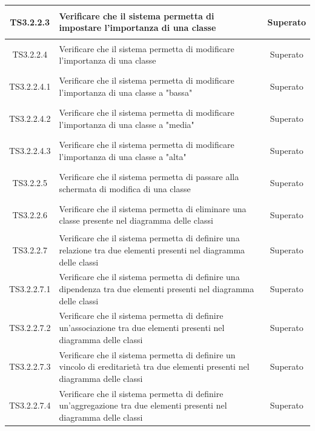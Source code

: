 \documentclass[../PianoDiQualifica.tex]{subfiles}
\begin{document}
\begin{longtable}{|c|>{\centering}p{10cm}|c|}
	\hline
	\hypertarget{TS3.2.2.3}{TS3.2.2.3} & Verificare che il sistema permetta di impostare l'importanza di una classe & Superato \\
	\hline
	\hypertarget{TS3.2.2.4}{TS3.2.2.4} & Verificare che il sistema permetta di modificare l'importanza di una classe & Superato \\
	\hline
	\hypertarget{TS3.2.2.4.1}{TS3.2.2.4.1} & Verificare che il sistema permetta di modificare l'importanza di una classe a "bassa" & Superato \\
	\hline
	\hypertarget{TS3.2.2.4.2}{TS3.2.2.4.2} & Verificare che il sistema permetta di modificare l'importanza di una classe a "media" & Superato \\
	\hline
	\hypertarget{TS3.2.2.4.3}{TS3.2.2.4.3} & Verificare che il sistema permetta di modificare l'importanza di una classe a "alta" & Superato \\
	\hline
	\hypertarget{TS3.2.2.5}{TS3.2.2.5} & Verificare che il sistema permetta di passare alla schermata di modifica di una classe & Superato \\
	\hline
	\hypertarget{TS3.2.2.6}{TS3.2.2.6} & Verificare che il sistema permetta di eliminare una classe presente nel diagramma delle classi & Superato \\
	\hline
	\hypertarget{TS3.2.2.7}{TS3.2.2.7} & Verificare che il sistema permetta di definire una relazione tra due elementi presenti nel diagramma delle classi & Superato \\
	\hline
	\hypertarget{TS3.2.2.7.1}{TS3.2.2.7.1} & Verificare che il sistema permetta di definire una dipendenza tra due elementi presenti nel diagramma delle classi & Superato \\
	\hline
	\hypertarget{TS3.2.2.7.2}{TS3.2.2.7.2} & Verificare che il sistema permetta di definire un'associazione tra due elementi presenti nel diagramma delle classi & Superato\\
	\hline
	\hypertarget{TS3.2.2.7.3}{TS3.2.2.7.3} & Verificare che il sistema permetta di definire un vincolo di ereditarietà tra due elementi presenti nel diagramma delle classi & Superato \\
	\hline
	\hypertarget{TS3.2.2.7.4}{TS3.2.2.7.4} & Verificare che il sistema permetta di definire un'aggregazione tra due elementi presenti nel diagramma delle classi & Superato \\
	\hline

\end{longtable}
\end{document}
